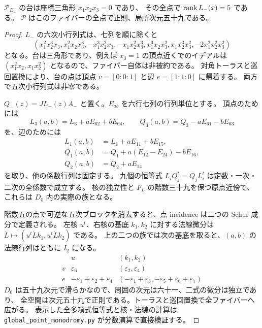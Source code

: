 \begin{proposition}[三角形上の正則性]\label{prop:triangle}
$\mathcal P_{E_-}$ の台は座標三角形 $x_1x_2x_3=0$ であり、
その全点で $\operatorname{rank} L_-(x)=5$ である。
$\mathcal P$ はこのファイバーの全点で正則、局所次元五十九である。
\end{proposition}
\begin{proof}
$L_-$ の六次小行列式は、七列を順に除くと
\[
 (x_1^2x_2^3x_3, x_1^2x_2x_3^3, -x_1^3x_2^2x_3,
 -x_1x_2^2x_3^3, x_1^3x_2x_3^2, x_1x_2^3x_3^2,
 -2x_1^2x_2^2x_3^2)
\]
となる。台は三角形であり、例えば $x_3=1$ の頂点近くでのイデアルは
$(x_1^2x_2,x_1x_2^2)$ となるので、ファイバー自体は非被約である。
対角トーラスと巡回置換により、台の点は頂点 $v=[0:0:1]$ と辺 $e=[1:1:0]$ に帰着する。
両方で五次小行列式は非零である。

$Q_-(z)=JL_-(z)A_-$ と置く。$E_{ab}$ を六行七列の行列単位とする。
頂点のためには
\[
 L_3(a,b)=L_3+aE_{62}+bE_{64},\qquad
 Q_3(a,b)=Q_3-aE_{61}-bE_{63}
\]
を、辺のためには
\[
\begin{aligned}
 L_1(a,b)&=L_1+aE_{11}+bE_{15},\\
 Q_1(a,b)&=Q_1+a(E_{12}-E_{24})-bE_{16},\\
 Q_2(a,b)&=Q_2+aE_{14}
\end{aligned}
\]
を取り、他の係数行列は固定する。
九個の恒等式 $L_iQ_j^t=Q_jL_i^t$ は定数・一次・二次の全係数で成立する。
核の独立性と $F_L$ の階数三十九を保つ原点近傍で、これらは $D_0$ 内の実際の族となる。

階数五の点で可逆な五次ブロックを消去すると、点 incidence は二つの Schur 成分で定義される。
左核 $u^t$、右核の基底 $k_1,k_2$ に対する法線微分は
$\dot L\mapsto(u^t\dot Lk_1,u^t\dot Lk_2)$ である。
上の二つの族では次の基底を取ると、$(a,b)$ の法線行列はともに $I_2$ になる。
\[
\begin{array}{c|c|c}
 &u&(k_1,k_2)\\\hline
v&\varepsilon_6&(\varepsilon_2,\varepsilon_4)\\
e&-\varepsilon_1+\varepsilon_2+\varepsilon_4&
(-\varepsilon_1+\varepsilon_3,-\varepsilon_5+\varepsilon_6+\varepsilon_7)
\end{array}
\]
$D_0$ は五十九次元で滑らかなので、周囲の次元は六十一、二式の微分は独立であり、
全空間は次元五十九で正則である。トーラスと巡回置換で全ファイバーへ広がる。
表示した全多項式恒等式と核・法線の計算は
\nolinkurl{global_point_monodromy.py} が分数演算で直接検証する。
\end{proof}

